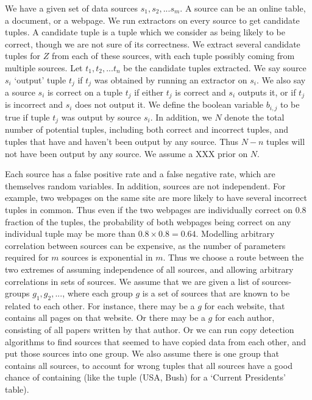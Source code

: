 \documentclass{sig-alternate}
\newcounter{prob}
\begin{document}
We have a given set of data sources $s_1, s_2, ... s_m$. A source can be an online table, a document, or a webpage. We run extractors on every source to get candidate tuples. A candidate tuple is a tuple which we consider as being likely to be correct, though we are not sure of its correctness. We extract several candidate tuples for $Z$ from each of these sources, with each tuple possibly coming from multiple sources. Let $t_1, t_2, ... t_n$ be the candidate tuples extracted. We say source $s_i$ `output' tuple $t_j$ if $t_j$ was obtained by running an extractor on $s_i$. We also say a source $s_i$ is correct on a tuple $t_j$ if either $t_j$ is correct and $s_i$ outputs it, or if $t_j$ is incorrect and $s_i$ does not output it. We define the boolean variable $b_{i,j}$ to be true if tuple $t_j$ was output by source $s_i$. In addition, we $N$ denote the total number of potential tuples, including both correct and incorrect tuples, and tuples that have and haven't been output by any source. Thus $N-n$ tuples will not have been output by any source. We assume a XXX prior on $N$.

Each source has a false positive rate and a false negative rate, which are themselves random variables. In addition, sources are not independent. For example, two webpages on the same site are more likely to have several incorrect tuples in common. Thus even if the two webpages are individually correct on $0.8$ fraction of the tuples, the probability of both webpages being correct on any individual tuple may be more than $0.8 \times 0.8 = 0.64$. Modelling arbitrary correlation between sources can be expensive, as the number of parameters required for $m$ sources is exponential in $m$. Thus we choose a route between the two extremes of assuming independence of all sources, and allowing arbitrary correlations in sets of sources. We assume that we are given a list of sources-groups $g_1, g_2, ...$, where each group $g$ is a set of sources that are known to be related to each other. For instance, there may be a $g$ for each website, that contains all pages on that website. Or there may be a $g$ for each author, consisting of all papers written by that author. Or we can run copy detection algorithms to find sources that seemed to have copied data from each other, and put those sources into one group. We also assume there is one group that contains all sources, to account for wrong tuples that all sources have a good chance of containing (like the tuple (USA, Bush) for a `Current Presidents' table).
\end{document}
